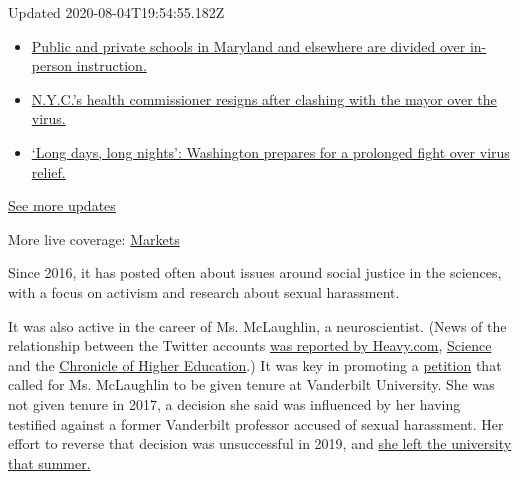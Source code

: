 Updated 2020-08-04T19:54:55.182Z

\begin{itemize}
\tightlist
\item
  \href{https://www.nytimes3xbfgragh.onion/2020/08/04/world/coronavirus-cases.html?action=click\&pgtype=Article\&state=default\&region=MAIN_CONTENT_1\&context=storylines_live_updates\#link-4825b93}{Public
  and private schools in Maryland and elsewhere are divided over
  in-person instruction.}
\item
  \href{https://www.nytimes3xbfgragh.onion/2020/08/04/world/coronavirus-cases.html?action=click\&pgtype=Article\&state=default\&region=MAIN_CONTENT_1\&context=storylines_live_updates\#link-4d1eafa8}{N.Y.C.'s
  health commissioner resigns after clashing with the mayor over the
  virus.}
\item
  \href{https://www.nytimes3xbfgragh.onion/2020/08/04/world/coronavirus-cases.html?action=click\&pgtype=Article\&state=default\&region=MAIN_CONTENT_1\&context=storylines_live_updates\#link-6b644638}{`Long
  days, long nights': Washington prepares for a prolonged fight over
  virus relief.}
\end{itemize}

\href{https://www.nytimes3xbfgragh.onion/2020/08/04/world/coronavirus-cases.html?action=click\&pgtype=Article\&state=default\&region=MAIN_CONTENT_1\&context=storylines_live_updates}{See
more updates}

More live coverage:
\href{https://www.nytimes3xbfgragh.onion/live/2020/08/04/business/stock-market-today-coronavirus?action=click\&pgtype=Article\&state=default\&region=MAIN_CONTENT_1\&context=storylines_live_updates}{Markets}

Since 2016, it has posted often about issues around social justice in
the sciences, with a focus on activism and research about sexual
harassment.

It was also active in the career of Ms. McLaughlin, a neuroscientist.
(News of the relationship between the Twitter accounts
\href{https://heavy.com/news/2020/08/sciencing_bi-bethann-mclaughlin-asu/}{was
reported by Heavy.com},
\href{https://www.sciencemag.org/news/2020/08/twitter-account-embattled-metoostem-founder-suspended}{Science}
and the
\href{https://www.chronicle.com/article/did-the-founder-of-metoostem-create-a-fake-online-persona-and-then-kill-it-off}{Chronicle
of Higher Education}.) It was key in promoting a
\href{https://www.change.org/p/vanderbilt-don-t-fire-prof-bethann-mclaughlin-for-standing-against-sexual-harassment}{petition}
that called for Ms. McLaughlin to be given tenure at Vanderbilt
University. She was not given tenure in 2017, a decision she said was
influenced by her having testified against a former Vanderbilt professor
accused of sexual harassment. Her effort to reverse that decision was
unsuccessful in 2019, and
\href{https://www.sciencemag.org/news/2019/07/metoostem-founder-out-vanderbilt}{she
left the university that summer.}

